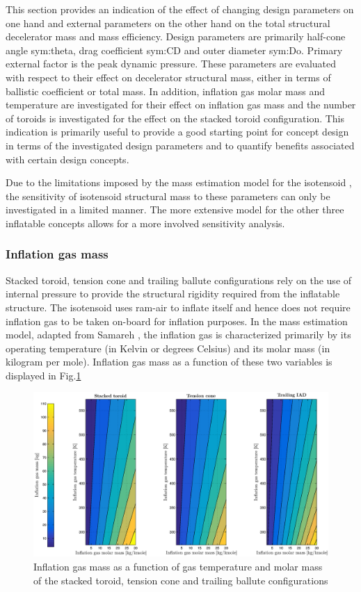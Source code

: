 This section provides an indication of the effect of changing design parameters on one hand and external parameters on the other hand on the total structural decelerator mass and mass efficiency. Design parameters are primarily half-cone angle \gls{sym:theta}, drag coefficient \gls{sym:CD} and outer diameter \gls{sym:Do}. Primary external factor is the peak dynamic pressure. These parameters are evaluated with respect to their effect on decelerator structural mass, either in terms of ballistic coefficient or total mass. In addition, inflation gas molar mass and temperature are investigated for their effect on inflation gas mass and the number of toroids is investigated for the effect on the stacked toroid configuration. This indication is primarily useful to provide a good starting point for concept design in terms of the investigated design parameters and to quantify benefits associated with certain design concepts. 

Due to the limitations imposed by the mass estimation model for the isotensoid \cite{Anderson1969}, the sensitivity of isotensoid structural mass to these parameters can only be investigated in a limited manner. The more extensive model for the other three inflatable concepts \cite{Samareh2011} allows for a more involved sensitivity analysis.

\subsubsection{Inflation gas mass}
Stacked toroid, tension cone and trailing ballute configurations rely on the use of internal pressure to provide the structural rigidity required from the inflatable structure. The isotensoid uses ram-air to inflate itself and hence does not require inflation gas to be taken on-board for inflation purposes. In the mass estimation model, adapted from Samareh \cite{Samareh2011}, the inflation gas is characterized primarily by its operating temperature (in Kelvin or degrees Celsius) and its molar mass (in kilogram per mole). Inflation gas mass as a function of these two variables is displayed in Fig.\ref{fig:inflmass}

\begin{figure}[H]
\hspace{-5mm}
\includegraphics[width = 1.0\textwidth]{Figure/gas_temp_mass.eps}
\caption{Inflation gas mass as a function of gas temperature and molar mass of the stacked toroid, tension cone and trailing ballute configurations}
\label{fig:inflmass}
\end{figure}

